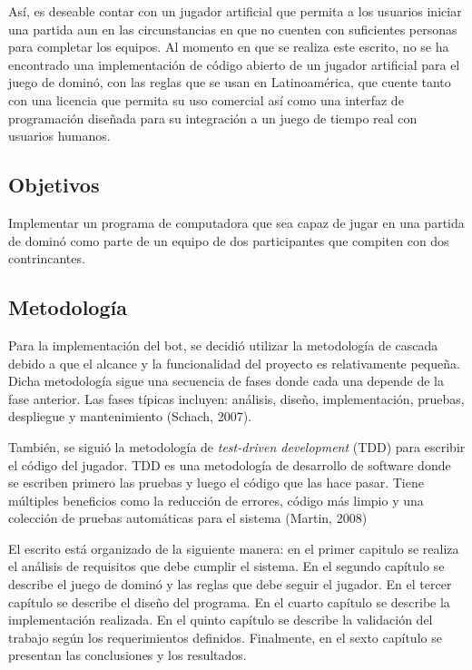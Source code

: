 Así, es deseable contar con un jugador artificial que permita a los usuarios
iniciar una partida aun en las circunstancias en que no cuenten con suficientes
personas para completar los equipos. Al momento en que se realiza este escrito,
no se ha encontrado una implementación de código abierto de un jugador
artificial para el juego de dominó, con las reglas que se usan en Latinoamérica,
que cuente tanto con una licencia que permita su uso comercial así como una
interfaz de programación diseñada para su integración a un juego de tiempo real
con usuarios humanos.



\subsection{Objetivos}

Implementar un programa de computadora que sea capaz de jugar en una partida de
dominó como parte de un equipo de dos participantes que compiten con dos
contrincantes.

\subsection{Metodología}

Para la implementación del bot, se decidió utilizar la metodología de cascada
debido a que el alcance y la funcionalidad del proyecto es relativamente
pequeña. Dicha metodología sigue una secuencia de fases donde cada una depende
de la fase anterior. Las fases típicas incluyen: análisis, diseño,
implementación, pruebas, despliegue y mantenimiento (Schach, 2007).

También, se siguió la metodología de \textit{test-driven development} (TDD) para
escribir el código del jugador. TDD es una metodología de desarrollo de software
donde se escriben primero las pruebas y luego el código que las hace pasar. Tiene 
múltiples beneficios como la reducción de errores, código más limpio y una colección
de pruebas automáticas para el sistema (Martin, 2008)

El escrito está organizado de la siguiente manera: en el primer capitulo se
realiza el análisis de requisitos que debe cumplir el sistema. En el segundo
capítulo se describe el juego de dominó y las reglas que debe seguir el jugador.
En el tercer capítulo se describe el diseño del programa. En el cuarto capítulo
se describe la implementación realizada. En el quinto capítulo se describe la
validación del trabajo según los requerimientos definidos. Finalmente, en el
sexto capítulo se presentan las conclusiones y los resultados.


